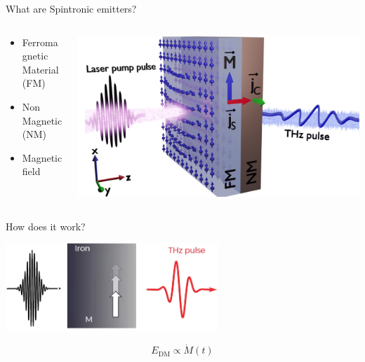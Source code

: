 \documentclass[aspectratio=1610, 9pt]{beamer}
\begin{document}
\begin{frame}{What are Spintronic emitters?}
  \begin{columns}
    \begin{column}{0.3\textwidth}
      \begin{itemize}
        \item Ferromagnetic Material (FM)
        \vspace{0.3in}
        \item Non Magnetic (NM)
        \vspace{0.3in}
        \item Magnetic field
      \end{itemize}
    \end{column}
    \begin{column}{.6\textwidth}
      \includegraphics[width=\textwidth]{pics/emitter.png}
    \end{column}
  \end{columns}
\end{frame}

\begin{frame}{How does it work?}
  \begin{center}
  \includegraphics[width=0.6\textwidth]{pics/quenching.png}
  \end{center}
  \begin{equation*}
    E_\text{DM} \propto \dot{M}(t)
  \end{equation*}
\end{frame}
\end{document}
